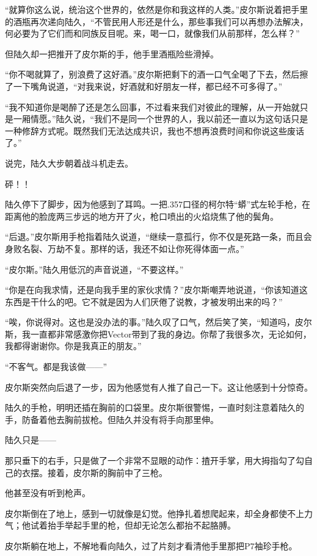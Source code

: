 “就算你这么说，统治这个世界的，依然是你和我这样的人类。”皮尔斯说着把手里的酒瓶再次递向陆久，“不管民用人形还是什么，那些事我们可以再想办法解决，何必要为了它们而和同族反目呢。来，喝一口，就像我们从前那样，怎么样？”

但陆久却一把推开了皮尔斯的手，他手里酒瓶险些滑掉。

“你不喝就算了，别浪费了这好酒。”皮尔斯把剩下的酒一口气全喝了下去，然后擦了一下嘴角说道，“对我来说，好酒就和好朋友一样，都已经不可多得了。”

“我不知道你是喝醉了还是怎么回事，不过看来我们对彼此的理解，从一开始就只是一厢情愿。”陆久说，“我们不是同一个世界的人，我以前还一直以为这句话只是一种修辞方式呢。既然我们无法达成共识，我也不想再浪费时间和你说这些废话了。”

说完，陆久大步朝着战斗机走去。

砰！！

陆久停下了脚步，因为他感到了耳鸣。一把.357口径的柯尔特“蟒”式左轮手枪，在距离他的脸庞两三步远的地方开了火，枪口喷出的火焰烧焦了他的鬓角。

“后退。”皮尔斯用手枪指着陆久说道，“继续一意孤行，你不仅是死路一条，而且会身败名裂、万劫不复。那样的话，我还不如让你死得体面一点。”

“皮尔斯。”陆久用低沉的声音说道，“不要这样。”

“你是在向我求情，还是向我手里的家伙求情？”皮尔斯嘲弄地说道，“你该知道这东西是干什么的吧。它不就是因为人们厌倦了说教，才被发明出来的吗？”

“唉，你说得对。这也是没办法的事。”陆久叹了口气，然后笑了笑，“知道吗，皮尔斯，我一直都非常感激你把Vector带到了我的身边。你帮了我很多次，无论如何，我都得谢谢你。你是我真正的朋友。”

“不客气。都是我该做——”

皮尔斯突然向后退了一步，因为他感觉有人推了自己一下。这让他感到十分惊奇。

陆久的手枪，明明还插在胸前的口袋里。皮尔斯很警惕，一直时刻注意着陆久的手，防备着他去胸前拔枪。但陆久并没有将手向那里伸。

陆久只是——

那只垂下的右手，只是做了一个非常不显眼的动作：揸开手掌，用大拇指勾了勾自己的衣摆。接着，皮尔斯的胸前中了三枪。

他甚至没有听到枪声。

皮尔斯倒在了地上，感到一切就像是幻觉。他挣扎着想爬起来，却全身都使不上力气；他试着抬手举起手里的枪，但却无论怎么都抬不起胳膊。

皮尔斯躺在地上，不解地看向陆久，过了片刻才看清他手里那把P7袖珍手枪。

